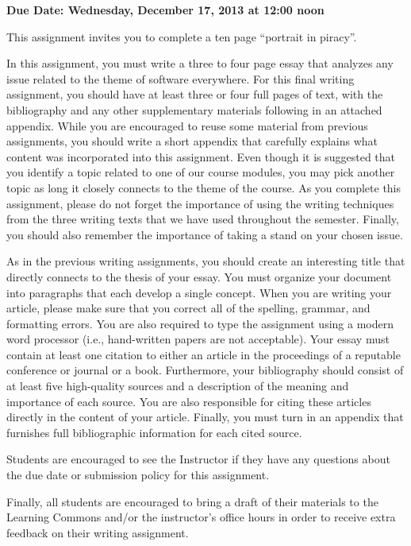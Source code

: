 

\usepackage[compact]{titlesec}



\vspace*{-.2in}
\begin{center}
	{\bf Due Date: Wednesday, December 17, 2013 at 12:00 noon}
\end{center}

This assignment invites you to complete a ten page ``portrait in piracy''.  


In this assignment, you must write a three to four page essay that analyzes any issue related to the theme of software
everywhere. For this final writing assignment, you should have at least three or four full pages of text, with the
bibliography and any other supplementary materials following in an attached appendix. While you are encouraged to reuse
some material from previous assignments, you should write a short appendix that carefully explains what content was
incorporated into this assignment. Even though it is suggested that you identify a topic related to one of our course
modules, you may pick another topic as long it closely connects to the theme of the course. As you complete this
assignment, please do not forget the importance of using the writing techniques from the three writing texts that we
have used throughout the semester. Finally, you should also remember the importance of taking a stand on your chosen
issue.

As in the previous writing assignments, you should create an interesting title that directly connects to the thesis of
your essay. You must organize your document into paragraphs that each develop a single concept. When you are writing
your article, please make sure that you correct all of the spelling, grammar, and formatting errors. You are also
required to type the assignment using a modern word processor (i.e., hand-written papers are not acceptable). Your essay
must contain at least one citation to either an article in the proceedings of a reputable conference or journal or a
book. Furthermore, your bibliography should consist of at least five high-quality sources and a description of the
meaning and importance of each source. You are also responsible for citing these articles directly in the content of
your article. Finally, you must turn in an appendix that furnishes full bibliographic information for each cited source.

Students are encouraged to see the Instructor if they have any questions about the due date or submission policy
for this assignment.

Finally, all students are encouraged to bring a draft of their materials to the Learning Commons and/or the instructor's
office hours in order to receive extra feedback on their writing assignment.


